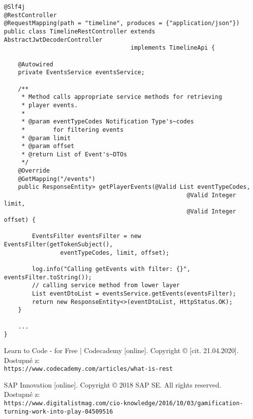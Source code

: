 \documentclass[12pt]{article}
\begin{document}
{\clearpage


\begin{lstlisting}
@Slf4j
@RestController
@RequestMapping(path = "timeline", produces = {"application/json"})
public class TimelineRestController extends AbstractJwtDecoderController
                                    implements TimelineApi {

    @Autowired
    private EventsService eventsService;

    /**
     * Method calls appropriate service methods for retrieving
     * player events.
     *
     * @param eventTypeCodes Notification Type's~codes
     *        for filtering events
     * @param limit
     * @param offset
     * @return List of Event's~DTOs
     */
    @Override
    @GetMapping("/events")
    public ResponseEntity> getPlayerEvents(@Valid List eventTypeCodes,
                                                    @Valid Integer limit,
                                                    @Valid Integer offset) {

        EventsFilter eventsFilter = new EventsFilter(getTokenSubject(),
                eventTypeCodes, limit, offset);

        log.info("Calling getEvents with filter: {}", eventsFilter.toString());
        // calling service method from lower layer
        List eventDtoList = eventsService.getEvents(eventsFilter);
        return new ResponseEntity<>(eventDtoList, HttpStatus.OK);
    }
    
    ...
}
\end{lstlisting}




\begin{literatura}

{
 Learn to Code - for Free | Codecademy [online]. 
Copyright © [cit. 21.04.2020]. 
Dostupné z:
\\
\texttt{https://www.codecademy.com/articles/what-is-rest}
}

{
SAP Innovation [online]. Copyright © 2018 SAP SE. All rights reserved.
Dostupné z:
\\
\texttt{https://www.digitalistmag.com/cio-knowledge/2016/10/03/gamification-turning-work-into-play-04509516}
}


\end{literatura}}
\end{document}
